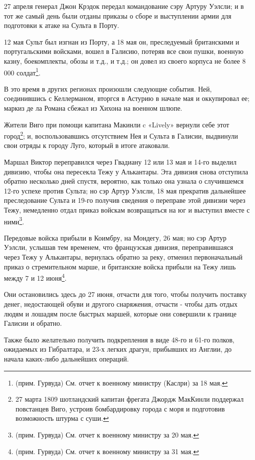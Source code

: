 \documentclass[
  oneside,
  12pt,
  titlepage]{book}
\begin{document}
27 апреля генерал Джон Крэдок передал командование сэру Артуру Уэлсли; и в тот же самый день были отданы приказы о сборе и выступлении армии для подготовки к атаке на Сульта в Порту.

12 мая Сульт был изгнан из Порту, а 18 мая он, преследуемый британскими и португальскими войсками, вошел в Галисию, потеряв все свои пушки, военную казну, боекомплекты, обозы и т.д., и т.д.; он довел из своего корпуса не более 8 000 солдат\footnote{(прим. Гурвуда) См. отчет к военному министру (Каслри) за 18 мая.}.

В это время в других регионах произошли следующие события. Ней, соединившись с Келлерманом, вторгся в Астурию в начале мая и оккупировал ее; маркиз де ла Романа сбежал из Хихона на военном шлюпе.

Жители Виго при помощи капитана Макинли c «Lively» вернули себе этот город\footnote{27 марта 1809 шотландский капитан фрегата Джордж МакКинли поддержал повстанцев Виго, устроив бомбардировку города с моря и подготовив возможность штурма с суши.}; и, воспользовавшись отсутствием Нея и Сульта в Галисии, выдвинули свои отряды к городу Луго, который в итоге атаковали.

Маршал Виктор переправился через Гвадиану 12 или 13 мая и 14-го выделил дивизию, чтобы она пересекла Тежу у Алькантары. Эта дивизия снова отступила обратно несколько дней спустя, вероятно, как только она узнала о случившемся 12-го успехе против Сульта; но сэр Артур Уэлсли, 18 мая прекратив дальнейшее преследование Сульта и 19-го получив сведения о переправе этой дивизии через Тежу, немедленно отдал приказ войскам возвращаться на юг и выступил вместе с ними\footnote{(прим. Гурвуда) См. отчет к военному министру за 20 мая.}.

Передовые войска прибыли в Коимбру, на Мондегу, 26 мая; но сэр Артур Уэлсли, услышав тем временем, что французская дивизия, переправившаяся через Тежу у Алькантары, вернулась обратно за реку, отменил первоначальный приказ о стремительном марше, и британские войска прибыли на Тежу лишь между 7 и 12 июня\footnote{(прим. Гурвуда) См. отчет к военному министру за 31 мая.}.

Они остановились здесь до 27 июня, отчасти для того, чтобы получить поставку денег, недостающей обуви и другого снаряжения, отчасти - чтобы дать отдых людям и лошадям после быстрых маршей, которые они совершили к границе Галисии и обратно.

Также было желательно получить подкрепления в виде 48-го и 61-го полков, ожидаемых из Гибралтара, и 23-х легких драгун, прибывших из Англии, до начала каких-либо дальнейших операций.
\end{document}
